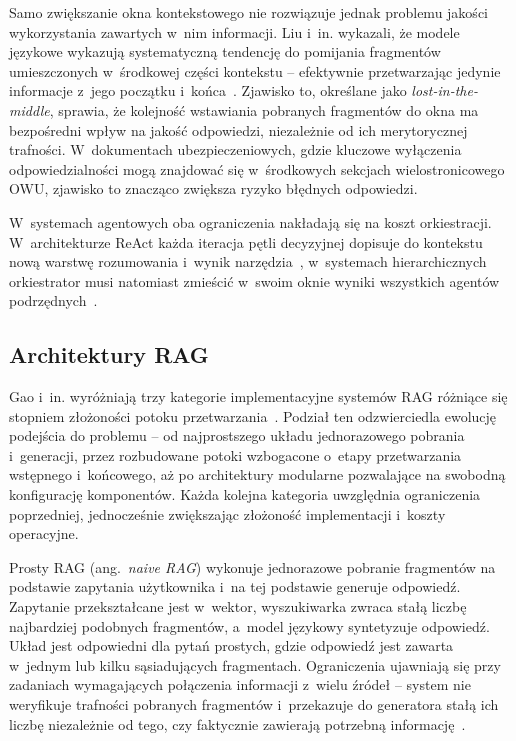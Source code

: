 Samo zwiększanie okna kontekstowego nie rozwiązuje jednak problemu jakości
wykorzystania zawartych w~nim informacji. Liu i~in. wykazali, że modele
językowe wykazują systematyczną tendencję do pomijania fragmentów umieszczonych
w~środkowej części kontekstu -- efektywnie przetwarzając jedynie informacje
z~jego początku i~końca~\cite{liu2024lost}. Zjawisko to, określane jako
\textit{lost-in-the-middle}, sprawia, że kolejność wstawiania pobranych
fragmentów do okna ma bezpośredni wpływ na jakość odpowiedzi, niezależnie od
ich merytorycznej trafności. W~dokumentach ubezpieczeniowych, gdzie kluczowe
wyłączenia odpowiedzialności mogą znajdować się w~środkowych sekcjach
wielostronicowego OWU, zjawisko to znacząco zwiększa ryzyko błędnych
odpowiedzi.

W~systemach agentowych oba ograniczenia nakładają się na koszt orkiestracji.
W~architekturze ReAct każda iteracja pętli decyzyjnej dopisuje do kontekstu
nową warstwę rozumowania i~wynik narzędzia~\cite{yao2022react}, w~systemach
hierarchicznych orkiestrator musi natomiast zmieścić w~swoim oknie wyniki
wszystkich agentów podrzędnych~\cite{hong2023metagpt}.

\subsection{Architektury RAG}\label{subsec:warianty-rag}

Gao i~in. wyróżniają trzy kategorie implementacyjne systemów RAG różniące się
stopniem złożoności potoku przetwarzania~\cite{gao2023retrieval}. Podział ten
odzwierciedla ewolucję podejścia do problemu -- od najprostszego układu
jednorazowego pobrania i~generacji, przez rozbudowane potoki wzbogacone o~etapy
przetwarzania wstępnego i~końcowego, aż po architektury modularne pozwalające
na swobodną konfigurację komponentów. Każda kolejna kategoria uwzględnia
ograniczenia poprzedniej, jednocześnie zwiększając złożoność implementacji
i~koszty operacyjne.

Prosty RAG (ang.~\textit{naive RAG}) wykonuje jednorazowe pobranie fragmentów
na podstawie zapytania użytkownika i~na tej podstawie generuje odpowiedź.
Zapytanie przekształcane jest w~wektor, wyszukiwarka zwraca stałą liczbę
najbardziej podobnych fragmentów, a~model językowy syntetyzuje odpowiedź. Układ
jest odpowiedni dla pytań prostych, gdzie odpowiedź jest zawarta w~jednym lub
kilku sąsiadujących fragmentach. Ograniczenia ujawniają się przy zadaniach
wymagających połączenia informacji z~wielu źródeł -- system nie weryfikuje
trafności pobranych fragmentów i~przekazuje do generatora stałą ich liczbę
niezależnie od tego, czy faktycznie zawierają potrzebną
informację~\cite{gao2023retrieval}.

